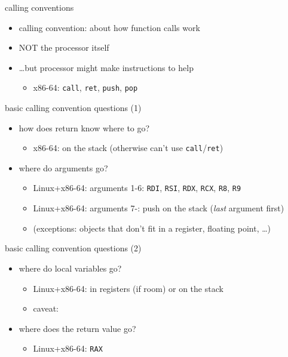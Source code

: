 \begin{frame}{calling conventions}
\begin{itemize}
\item calling convention:  about how function calls work
\item {} NOT the processor itself
\item \ldots but processor might make instructions to help
    \begin{itemize}
    \item x86-64: \texttt{call}, \texttt{ret}, \texttt{push}, \texttt{pop}
    \end{itemize}
\end{itemize}
\end{frame}

\begin{frame}{basic calling convention questions (1)}
\begin{itemize}
\item how does return know where to go?
    \begin{itemize}
    \item<2-> x86-64: on the stack (otherwise can't use \texttt{call}/\texttt{ret})
    \end{itemize}
\item where do arguments go?
    \begin{itemize}
    \item<3-> Linux+x86-64: arguments 1-6: \texttt{RDI}, \texttt{RSI}, \texttt{RDX}, \texttt{RCX}, \texttt{R8}, \texttt{R9}
    \item<3-> Linux+x86-64: arguments 7-: push on the stack (\textit{last} argument first)
    \item<3-> (exceptions: objects that don't fit in a register, floating point, \ldots)
    \end{itemize}
\end{itemize}
\end{frame}

\begin{frame}{basic calling convention questions (2)}
\begin{itemize}
\item where do local variables go?
    \begin{itemize}
    \item<2-> Linux+x86-64: in registers (if room) or on the stack
    \item<2-> caveat: 
    \end{itemize}
\item where does the return value go?
    \begin{itemize}
    \item<3-> Linux+x86-64: \texttt{RAX}
    \end{itemize}
\end{itemize}
\end{frame}

